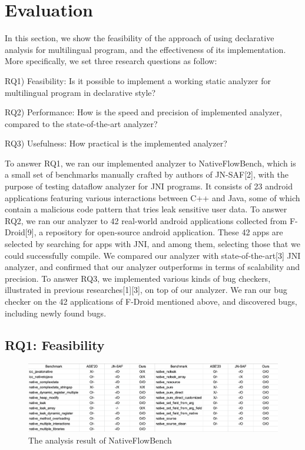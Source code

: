 \section{Evaluation}
In this section, we show the feasibility of the approach of using declarative
analysis for multilingual program, and the effectiveness of its
implementation. More specifically, we set three research questions as follow:

RQ1) Feasibility: Is it possible to implement a working static analyzer for multilingual program in declarative style?

RQ2) Performance: How is the speed and precision of implemented analyzer, compared to the state-of-the-art analyzer?

RQ3) Usefulness: How practical is the implemented analyzer?

To answer RQ1, we ran our implemented analyzer to NativeFlowBench, which is a
small set of benchmarks manually crafted by authors of JN-SAF[2], with the
purpose of testing dataflow analyzer for JNI programs. It consists of 23
android applications featuring various interactions between C++ and Java, some
of which contain a malicious code pattern that tries leak sensitive user data.
To answer RQ2, we ran our analyzer to 42 real-world android applications
collected from F-Droid[9], a repository for open-source android application. These
42 apps are selected by searching for apps with JNI, and among them, selecting those
that we could successfully compile. We compared our analyzer with
state-of-the-art[3] JNI analyzer, and confirmed that our analyzer outperforms
in terms of scalability and precision. To answer RQ3, we implemented various
kinds of bug checkers, illustrated in previous researches[1][3], on top of our
analyzer. We ran our bug checker on the 42 applications of F-Droid mentioned
above, and discovered  bugs, including  newly found bugs.


\subsection{RQ1: Feasibility}
\begin{figure}[t]
  \centering
  \vspace{2mm}
  \includegraphics[width=\textwidth]{img/table1}
  \vspace*{-1.5em}
  \caption{The analysis result of NativeFlowBench}
  \label{fig:table1}
\vspace*{-.5em}
\end{figure}

